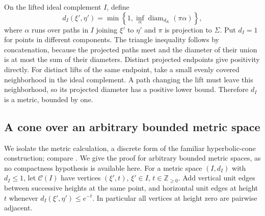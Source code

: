 \documentclass[11pt,reqno]{amsart}
\numberwithin{equation}{section}
\theoremstyle{definition}
\theoremstyle{remark}
\newcommand{\Z}{\mathbb Z}
\DeclareMathOperator{\diam}{diam}
\begin{document}
On the lifted ideal complement $I$, define
\begin{equation}\label{mod:ideal-metric}
 d_I(\xi',\eta')=
 \min\left\{1,\inf_\alpha\diam_{d_K}(\pi\alpha)\right\},
\end{equation}
where $\alpha$ runs over paths in $I$ joining $\xi'$ to $\eta'$
and $\pi$ is projection to $\Sigma$.  Put $d_I=1$ for points in
different components.  The triangle inequality follows by
concatenation, because the projected paths meet and the diameter
of their union is at most the sum of their diameters.  Distinct
projected endpoints give positivity directly.  For distinct lifts
of the same endpoint, take a small evenly covered neighborhood
in the ideal complement.  A path changing the lift must leave
this neighborhood, so its projected diameter has a positive
lower bound.  Therefore $d_I$ is a metric, bounded by one.

\subsection{A cone over an arbitrary bounded metric space}

We isolate the metric calculation, a discrete form of the familiar
hyperbolic-cone construction; compare \cite[Section~7]{BonkSchramm2000}.
We give the proof for arbitrary bounded metric spaces, as no
compactness hypothesis is available here.  For a metric space $(I,d_I)$
with $d_I\le1$, let $\mathcal C(I)$ have vertices $(\xi',t)$,
$\xi'\in I$, $t\in\Z_{\ge0}$.  Add vertical unit edges between
successive heights at the same point, and horizontal unit edges
at height $t$ whenever $d_I(\xi',\eta')\le e^{-t}$.
In particular all vertices at height zero are pairwise adjacent.
\end{document}
